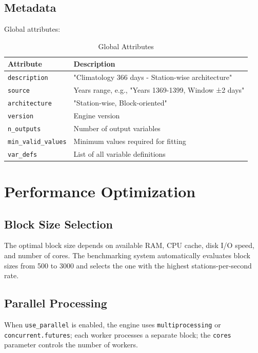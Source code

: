 ﻿\documentclass[12pt,a4paper]{report}
\begin{document}
\section{Metadata}
Global attributes:
\begin{table}[H]
    \centering
    \caption{Global Attributes}
    \begin{tabular}{l l}
        \toprule
        \textbf{Attribute} & \textbf{Description} \\
        \midrule
        \texttt{description} & "Climatology 366 days - Station-wise architecture" \\
        \texttt{source} & Years range, e.g., "Years 1369-1399, Window ±2 days" \\
        \texttt{architecture} & "Station-wise, Block-oriented" \\
        \texttt{version} & Engine version \\
        \texttt{n\_outputs} & Number of output variables \\
        \texttt{min\_valid\_values} & Minimum values required for fitting \\
        \texttt{var\_defs} & List of all variable definitions \\
        \bottomrule
    \end{tabular}
\end{table}

\chapter{Performance Optimization}
\section{Block Size Selection}
The optimal block size depends on available RAM, CPU cache, disk I/O speed, and number of cores. The benchmarking system automatically evaluates block sizes from 500 to 3000 and selects the one with the highest stations-per-second rate.

\section{Parallel Processing}
When \texttt{use\_parallel} is enabled, the engine uses \texttt{multiprocessing} or \texttt{concurrent.futures}; each worker processes a separate block; the \texttt{cores} parameter controls the number of workers.
\end{document}
